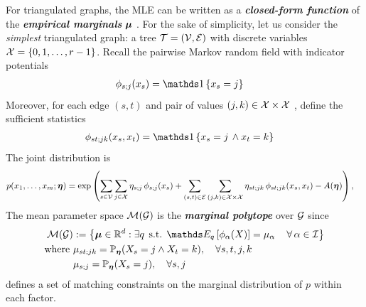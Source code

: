 \documentclass[11pt]{article}
\begin{document}
For triangulated graphs, the MLE can be written as a \emph{\textbf{closed-form function}} of the \emph{\textbf{empirical marginals}} $\boldsymbol{\mu}$ \citep{wainwright2008graphical}. For the sake of simplicity, let us consider the \emph{simplest} triangulated graph: a tree ${\mathcal T} = ({\mathcal V}, {\mathcal E})$ with discrete variables ${\mathcal X} = \left\{0,1,\ldots, r-1\right\}$. Recall the pairwise Markov random field with indicator potentials
\begin{align}
\phi_{s;j}(x_s) &= \ind{x_s = j}  \label{eqn: metric_label_sufficient}
\end{align} 
Moreover, for each edge $(s,t)$ and pair of values $(j,k) \in {\mathcal X} \times {\mathcal X}$ , define the sufficient statistics
\begin{align}
\phi_{st;jk}(x_s, x_t) &= \ind{x_s = j \, \land x_{t} = k}  \label{eqn: metric_label_sufficient2}
\end{align}
The joint distribution is 
\begin{align}
p(x_1, \ldots, x_m; \boldsymbol{\eta}) &= \exp\left(\sum_{s\in {\mathcal V}}\sum_{j \in {\mathcal X}}\eta_{s;j}\,\phi_{s;j}(x_s)  + \sum_{(s,t) \in {\mathcal E}}\sum_{(j,k) \in {\mathcal X} \times {\mathcal X}}\eta_{st;jk}\,\phi_{st;jk}(x_s, x_t)  - A(\boldsymbol{\eta})\right), \label{eqn: potts_model}
\end{align} The mean parameter space ${\mathcal M}({\mathcal G})$ is the \emph{\textbf{marginal polytope}} over ${\mathcal G}$ since 
\begin{align*}
\cM(\cG) &:= \set{\mb{\mu} \in \bR^d: \exists q\,\; \text{s.t. } \E{q}{\phi_{\alpha}(X)} = \mu_{\alpha}\,\quad  \forall\, \alpha \in \cI} \\
\text{where }& \mu_{st;jk} = \bP_{\mb{\eta}}(X_s = j \land X_t = k), \quad \forall s,t, j, k \\
& \mu_{s;j} = \bP_{\mb{\eta}}(X_s = j ),  \quad \forall s, j
\end{align*} defines a set of matching constraints on the marginal distribution of $p$ within each factor.  
\end{document}
